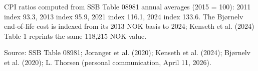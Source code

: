 \begin{table}
{\begin{threeparttable}
\begin{tablenotes}
\item CPI ratios computed from SSB Table 08981 annual averages (2015 = 100): 2011 index 93.3, 2013 index 95.9, 2021 index 116.1, 2024 index 133.6. The Bjørnelv end-of-life cost is indexed from its 2013 NOK basis to 2024; Kenseth et al. (2024) Table 1 reprints the same 118,215 NOK value.
\item Source: SSB Table 08981; Joranger et al. (2020); Kenseth et al. (2024); Bjørnelv et al. (2020); L. Thorsen (personal communication, April 11, 2026).
\end{tablenotes}
\end{threeparttable}
}
\end{table}
